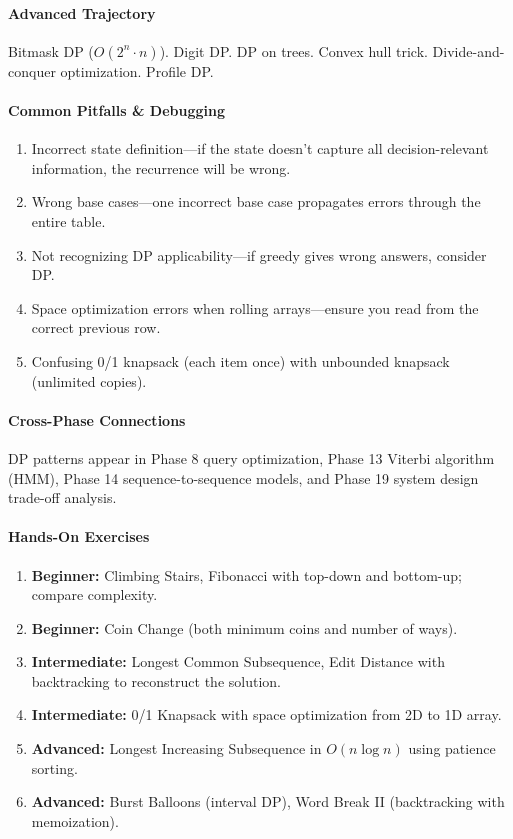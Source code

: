 \documentclass[11pt, a4paper, oneside]{report}
\begin{document}
\paragraph{Advanced Trajectory} Bitmask DP ($O(2^n \cdot n)$). Digit DP. DP on trees. Convex hull trick. Divide-and-conquer optimization. Profile DP.

\paragraph{Common Pitfalls \& Debugging}
\begin{enumerate}[leftmargin=*]
\item Incorrect state definition---if the state doesn't capture all decision-relevant information, the recurrence will be wrong.
\item Wrong base cases---one incorrect base case propagates errors through the entire table.
\item Not recognizing DP applicability---if greedy gives wrong answers, consider DP.
\item Space optimization errors when rolling arrays---ensure you read from the correct previous row.
\item Confusing 0/1 knapsack (each item once) with unbounded knapsack (unlimited copies).
\end{enumerate}

\paragraph{Cross-Phase Connections} DP patterns appear in Phase 8 query optimization, Phase 13 Viterbi algorithm (HMM), Phase 14 sequence-to-sequence models, and Phase 19 system design trade-off analysis.

\paragraph{Hands-On Exercises}
\begin{enumerate}[leftmargin=*]
\item \textbf{Beginner:} Climbing Stairs, Fibonacci with top-down and bottom-up; compare complexity.
\item \textbf{Beginner:} Coin Change (both minimum coins and number of ways).
\item \textbf{Intermediate:} Longest Common Subsequence, Edit Distance with backtracking to reconstruct the solution.
\item \textbf{Intermediate:} 0/1 Knapsack with space optimization from 2D to 1D array.
\item \textbf{Advanced:} Longest Increasing Subsequence in $O(n \log n)$ using patience sorting.
\item \textbf{Advanced:} Burst Balloons (interval DP), Word Break II (backtracking with memoization).
\end{enumerate}
\end{document}
